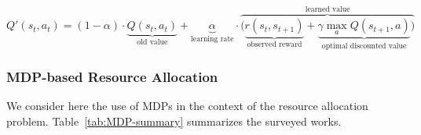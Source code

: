 \begin{equation}\label{eq:updatingq}
Q'(s_{t},a_{t}) = (1-\alpha) \cdot \underbrace{Q(s_{t},a_{t})}_{\text{old value}} + \underbrace{\alpha}_{\text{learning rate}} \cdot  \overbrace{\bigg( \underbrace{r(s_t,s_{t+1})}_{\text{observed reward}} + \underbrace{\gamma \max_{a}Q(s_{t+1}, a)}_{\text{optimal discounted value}} \bigg) }^{\text{learned value}}
\end{equation}



\subsubsection{MDP-based Resource Allocation}
\textbf{\newline}
We consider here the use of MDPs in the context of the resource allocation problem.
Table~\ref{tab:MDP-summary} summarizes the surveyed works.



